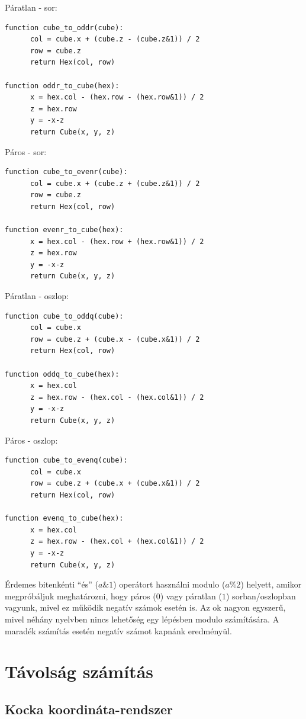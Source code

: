 Páratlan - sor:
\begin{verbatim}
function cube_to_oddr(cube):
      col = cube.x + (cube.z - (cube.z&1)) / 2
      row = cube.z
      return Hex(col, row)

function oddr_to_cube(hex):
      x = hex.col - (hex.row - (hex.row&1)) / 2
      z = hex.row
      y = -x-z
      return Cube(x, y, z)
\end{verbatim}

Páros - sor:
\begin{verbatim}
function cube_to_evenr(cube):
      col = cube.x + (cube.z + (cube.z&1)) / 2
      row = cube.z
      return Hex(col, row)

function evenr_to_cube(hex):
      x = hex.col - (hex.row + (hex.row&1)) / 2
      z = hex.row
      y = -x-z
      return Cube(x, y, z)
\end{verbatim}

Páratlan - oszlop:
\begin{verbatim}
function cube_to_oddq(cube):
      col = cube.x
      row = cube.z + (cube.x - (cube.x&1)) / 2
      return Hex(col, row)

function oddq_to_cube(hex):
      x = hex.col
      z = hex.row - (hex.col - (hex.col&1)) / 2
      y = -x-z
      return Cube(x, y, z)
\end{verbatim}

Páros - oszlop:
\begin{verbatim}
function cube_to_evenq(cube):
      col = cube.x
      row = cube.z + (cube.x + (cube.x&1)) / 2
      return Hex(col, row)

function evenq_to_cube(hex):
      x = hex.col
      z = hex.row - (hex.col + (hex.col&1)) / 2
      y = -x-z
      return Cube(x, y, z)
\end{verbatim}

\noindent Érdemes bitenkénti “és” ($a \& 1$) operátort használni modulo ($a \% 2$) helyett, amikor megpróbáljuk meghatározni, hogy páros ($0$) vagy páratlan ($1$) sorban/oszlopban vagyunk, mivel ez működik negatív számok esetén is. Az ok nagyon egyszerű, mivel néhány nyelvben nincs lehetőség egy lépésben modulo számítására. A maradék számítás esetén negatív számot kapnánk eredményül. 

\section{Távolság számítás}

\subsection{Kocka koordináta-rendszer}

